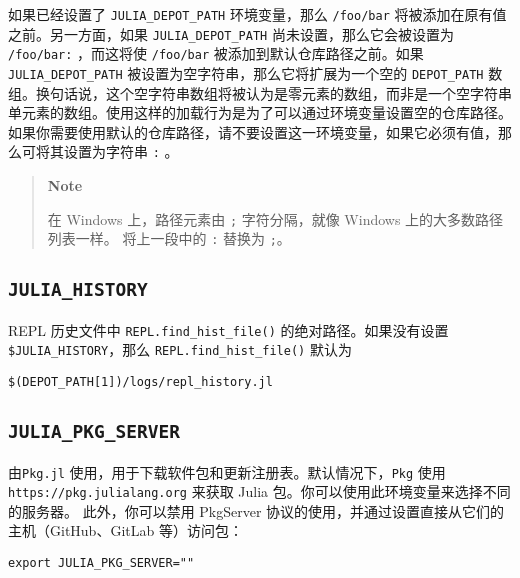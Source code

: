 如果已经设置了 \texttt{JULIA\_DEPOT\_PATH} 环境变量，那么 \texttt{/foo/bar} 将被添加在原有值之前。另一方面，如果 \texttt{JULIA\_DEPOT\_PATH} 尚未设置，那么它会被设置为 \texttt{/foo/bar:} ，而这将使 \texttt{/foo/bar} 被添加到默认仓库路径之前。如果 \texttt{JULIA\_DEPOT\_PATH} 被设置为空字符串，那么它将扩展为一个空的 \texttt{DEPOT\_PATH} 数组。换句话说，这个空字符串数组将被认为是零元素的数组，而非是一个空字符串单元素的数组。使用这样的加载行为是为了可以通过环境变量设置空的仓库路径。如果你需要使用默认的仓库路径，请不要设置这一环境变量，如果它必须有值，那么可将其设置为字符串 \texttt{:} 。



\begin{quote}
\textbf{Note}

在 Windows 上，路径元素由 \texttt{;} 字符分隔，就像 Windows 上的大多数路径列表一样。 将上一段中的 \texttt{:} 替换为 \texttt{;}。

\end{quote}


\hypertarget{7464422147684280847}{}


\subsection{\texttt{JULIA\_HISTORY}}



REPL 历史文件中 \texttt{REPL.find\_hist\_file()} 的绝对路径。如果没有设置 \texttt{\$JULIA\_HISTORY}，那么 \texttt{REPL.find\_hist\_file()} 默认为




\begin{lstlisting}
$(DEPOT_PATH[1])/logs/repl_history.jl
\end{lstlisting}



\hypertarget{8533599099446257685}{}


\subsection{\texttt{JULIA\_PKG\_SERVER}}



由\texttt{Pkg.jl} 使用，用于下载软件包和更新注册表。默认情况下，\texttt{Pkg} 使用 \texttt{https://pkg.julialang.org} 来获取 Julia 包。你可以使用此环境变量来选择不同的服务器。 此外，你可以禁用 PkgServer 协议的使用，并通过设置直接从它们的主机（GitHub、GitLab 等）访问包：




\begin{lstlisting}
export JULIA_PKG_SERVER=""
\end{lstlisting}



